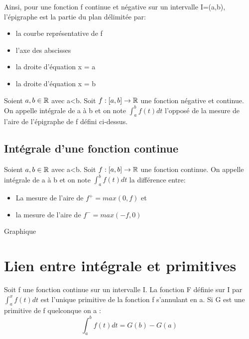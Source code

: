 Ainsi, pour une fonction f continue et négative sur un intervalle I=(a,b),
l'épigraphe est la partie du plan délimitée par:
\begin{itemize}
\item la courbe représentative de f
\item l'axe des abscisses
\item la droite d'équation x = a
\item la droite d'équation x = b
\end{itemize}

\begin{mydef}
  Soient $a,b \in \mathbb{R}$ avec a<b. Soit $f:[a,b] \to \mathbb{R}$  une fonction
  négative et continue. On appelle intégrale de a à b et on note
  $\int_a^b f(t) dt$ l'opposé de la mesure de l'aire de l'épigraphe de f défini
  ci-dessus. 
\end{mydef} 

\subsection{Intégrale d'une fonction continue}
\begin{mydef}
  Soient $a,b \in \mathbb{R}$ avec a<b. Soit $f:[a,b] \to \mathbb{R}$  une fonction
  continue. On appelle intégrale de a à b et on note
  $\int_a^b f(t) dt$ la différence entre:
  \begin{itemize}[label=$\bullet$, leftmargin=2cm]
  \item La mesure de l'aire de $f^+=max(0,f)$ et
  \item la mesure de l'aire de $f^-=max(-f,0)$
  \end{itemize}
\end{mydef}

\note Graphique
\section{Lien entre intégrale et primitives}
\begin{theo}
  Soit f une fonction continue sur un intervalle I. La fonction F
  définie sur I par $\int_a^x f(t) dt$ est l'unique primitive de la fonction
  f s'annulant en a. Si G est une primitive de f quelconque on a :
  \[
    \int_a^b f(t) dt = G(b) - G(a)
  \]
\end{theo}

